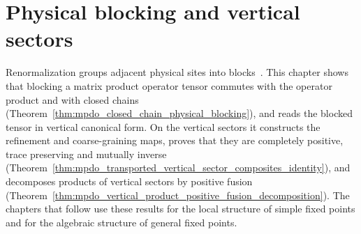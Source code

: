 \chapter{Physical blocking and vertical sectors}
\label{ch:mpdo_rfp_gibbs_blocking}

Renormalization groups adjacent physical sites into
blocks~\cite{Cirac2016MPDO_arXiv}. This chapter shows that blocking a matrix
product operator tensor commutes with the operator product and with closed
chains (Theorem~\ref{thm:mpdo_closed_chain_physical_blocking}), and reads the
blocked tensor in vertical canonical form. On the vertical sectors it
constructs the refinement and coarse-graining maps, proves that they are
completely positive, trace preserving and mutually inverse
(Theorem~\ref{thm:mpdo_transported_vertical_sector_composites_identity}), and
decomposes products of vertical sectors by positive fusion
(Theorem~\ref{thm:mpdo_vertical_product_positive_fusion_decomposition}). The chapters that follow use
these results for the local structure of simple fixed points and for the
algebraic structure of general fixed points.



